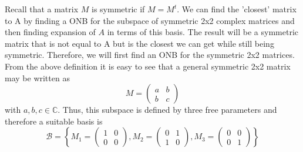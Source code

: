 \documentclass[a4paper, 11pt]{article}
\newcommand{\C}{\mathbb{C}}
\newenvironment{solution}{%
	\begin{list}{}{%
			\setlength{\topsep}{0pt}%
			\setlength{\leftmargin}{1.5cm}%
			\setlength{\rightmargin}{1.5cm}%
			\setlength{\listparindent}{\parindent}%
			\setlength{\itemindent}{\parindent}%
			\setlength{\parsep}{\parskip}%
		}%
		\item[]}{\end{list}}
\begin{document}
\begin{solution}
  \noindent Recall that a matrix $M$ is symmetric if $M=M^t$. We can find the 'closest' matrix to A by finding a ONB for the subspace of symmetric 2x2 complex matrices and then finding expansion of $A$ in terms of this basis. The result will be a symmetric matrix that is not equal to A but is the closest we can get while still being symmetric. Therefore, we will first find an ONB for the symmetric 2x2 matrices.\\

  \noindent From the above definition it is easy to see that a general symmetric 2x2 matrix may be written as
  \begin{equation*}
    M = \begin{pmatrix} a & b \\ b & c \end{pmatrix}
  \end{equation*}
  with $a,b,c\in\C$. Thus, this subspace is defined by three free parameters and therefore a suitable basis is
  \begin{equation*}
    \mathcal{B} = \left\{ M_1=\begin{pmatrix} 1 & 0 \\ 0 & 0 \end{pmatrix}, M_2=\begin{pmatrix} 0 & 1 \\ 1 & 0 \end{pmatrix}, M_3=\begin{pmatrix}0 & 0 \\ 0 & 1 \end{pmatrix}   \right\}
  \end{equation*}


\end{solution}
\end{document}
